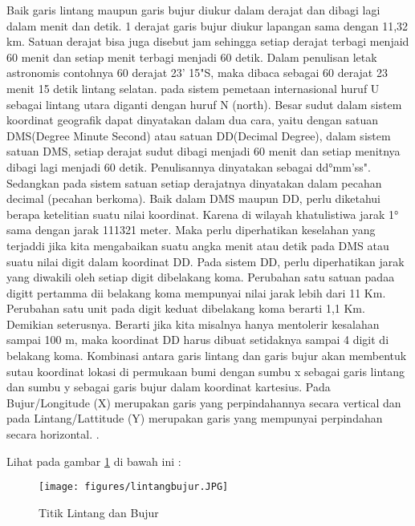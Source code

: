 Baik garis lintang maupun garis bujur diukur dalam derajat dan dibagi lagi dalam menit dan detik. 1 derajat garis bujur diukur lapangan sama dengan 11,32 km. Satuan derajat bisa juga disebut jam sehingga setiap derajat terbagi menjaid 60 menit dan setiap menit terbagi menjadi 60 detik. Dalam penulisan letak astronomis contohnya 60 derajat 23' 15"S, maka dibaca sebagai 60 derajat 23 menit 15 detik lintang selatan. pada sistem pemetaan internasional huruf U sebagai lintang utara diganti dengan huruf N (north). Besar sudut dalam sistem koordinat geografik dapat dinyatakan dalam dua cara, yaitu dengan satuan DMS(Degree Minute Second) atau satuan DD(Decimal Degree), dalam sistem satuan DMS, setiap derajat sudut dibagi menjadi 60 menit dan setiap menitnya dibagi lagi menjadi 60 detik. Penulisannya dinyatakan sebagai dd°mm'ss". Sedangkan pada sistem satuan setiap derajatnya dinyatakan dalam pecahan decimal (pecahan berkoma). Baik dalam DMS maupun DD, perlu diketahui berapa ketelitian suatu nilai koordinat. Karena di wilayah khatulistiwa jarak 1° sama dengan jarak 111321 meter. Maka perlu diperhatikan keselahan yang terjaddi jika kita mengabaikan suatu angka menit atau detik pada DMS atau suatu nilai digit dalam koordinat DD. Pada sistem DD, perlu diperhatikan jarak yang diwakili oleh setiap digit dibelakang koma. Perubahan satu satuan padaa digitt pertamma dii belakang koma mempunyai nilai jarak lebih dari 11 Km. Perubahan satu unit pada digit keduat dibelakang koma berarti 1,1 Km. Demikian seterusnya. Berarti jika kita misalnya hanya mentolerir kesalahan sampai 100 m, maka koordinat DD harus dibuat setidaknya sampai 4 digit di belakang koma. Kombinasi antara garis lintang dan garis bujur akan membentuk sutau koordinat lokasi di permukaan bumi dengan sumbu x sebagai garis lintang dan sumbu y sebagai garis bujur dalam koordinat kartesius. Pada Bujur/Longitude (X) merupakan garis yang perpindahannya secara vertical dan pada Lintang/Lattitude (Y) merupakan garis yang mempunyai perpindahan secara horizontal. \cite{zuhdi2012sistem}.

Lihat pada gambar \ref{lintangbujur} di bawah ini :
\begin{figure}[ht]
	\centerline{\texttt{[image: figures/lintangbujur.JPG]}}
	\caption{Titik Lintang dan Bujur}
	\label{lintangbujur}
	\end{figure}

